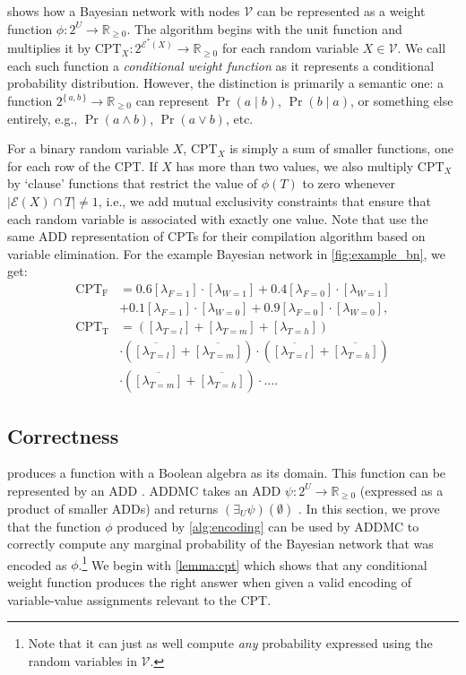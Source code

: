 shows how a Bayesian network with nodes $\mathcal{V}$ can be
represented as a weight function $\phi\colon 2^U \to \mathbb{R}_{\ge 0}$. The
algorithm begins with the unit function and multiplies it by
$\mathrm{CPT}_X\colon 2^{\mathcal{E}^*(X)} \to \mathbb{R}_{\ge 0}$ for each
random variable $X \in \mathcal{V}$. We call each such function a
\emph{conditional weight function} as it represents a conditional probability
distribution. However, the distinction is primarily a semantic one: a function
$2^{\{\, a, b \,\}} \to \mathbb{R}_{\ge 0}$ can represent $\Pr(a \mid b)$,
$\Pr(b \mid a)$, or something else entirely, e.g., $\Pr(a \land b)$,
$\Pr(a \lor b)$, etc.

For a binary random variable $X$, $\mathrm{CPT}_X$ is simply a sum of smaller
functions, one for each row of the CPT\@. If $X$ has more than two values, we
also multiply $\mathrm{CPT}_X$ by `clause' functions that restrict the value of
$\phi(T)$ to zero whenever $|\mathcal{E}(X) \cap T| \ne 1$, i.e., we add mutual
exclusivity constraints that ensure that each random variable is associated with
exactly one value. Note that \citet{DBLP:conf/ijcai/ChaviraD07} use the same ADD
representation of CPTs for their compilation algorithm based on variable
elimination. For the example Bayesian network in \cref{fig:example_bn}, we get:
\begin{align*}
  \mathrm{CPT_F} &= 0.6[\lambda_{F=1}] \cdot [\lambda_{W=1}] + 0.4[\lambda_{F=0}] \cdot [\lambda_{W=1}] \\
                 &+ 0.1[\lambda_{F=1}] \cdot [\lambda_{W=0}] + 0.9[\lambda_{F=0}] \cdot [\lambda_{W=0}], \\
  \mathrm{CPT_T} &= ([\lambda_{T=l}] + [\lambda_{T=m}] + [\lambda_{T=h}]) \\
                 &\cdot (\overline{[\lambda_{T=l}]} + \overline{[\lambda_{T=m}]}) \cdot (\overline{[\lambda_{T=l}]} + \overline{[\lambda_{T=h}]}) \\
                 &\cdot (\overline{[\lambda_{T=m}]} + \overline{[\lambda_{T=h}]}) \cdot \dots.
\end{align*}

\subsection{Correctness}

 produces a function with a Boolean algebra as its domain.
This function can be represented by an ADD
\citep{DBLP:journals/fmsd/BaharFGHMPS97}. \textsc{ADDMC} takes an ADD
$\psi\colon 2^{U} \to \mathbb{R}_{\ge 0}$ (expressed as a product of smaller
ADDs) and returns $(\exists_U\psi)(\emptyset)$ \citep{DBLP:conf/aaai/DudekPV20}.
In this section, we prove that the function $\phi$ produced by
\cref{alg:encoding} can be used by \textsc{ADDMC} to correctly compute any
marginal probability of the Bayesian network that was encoded as
$\phi$.\footnote{Note that it can just as well compute \emph{any} probability
  expressed using the random variables in $\mathcal{V}$.} We begin with
\cref{lemma:cpt} which shows that any conditional weight function produces the
right answer when given a valid encoding of variable-value assignments relevant
to the CPT\@.

